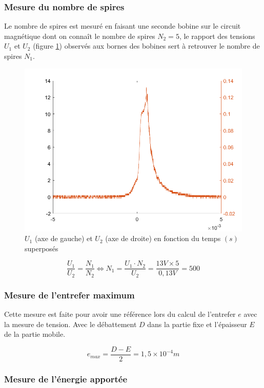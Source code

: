 \documentclass{rapportENS}
\begin{document}
 \subsubsection*{Mesure du nombre de spires}
 
 Le nombre de spires est mesuré en faisant une seconde bobine sur le circuit magnétique dont on connaît le nombre de spires $N_2 = 5$, le rapport des tensions $U_1$ et $U_2$ (figure \ref{nombredespire}) observés aux bornes des bobines sert à retrouver le nombre de spires $N_1$.
 
 \begin{figure}[h!]
  \centering
 \includegraphics[width = .5\linewidth]{nombredespire.png}
 \vspace{0.3cm}
 \caption{$U_1$ (axe de gauche) et $U_2$ (axe de droite) en fonction du temps $(s)$ superposés}
 \label{nombredespire}
 \end{figure}
 
 \begin{equation}
     \frac{U_1}{U_2} = \frac{N_1}{N_2} \Leftrightarrow N_1 = \frac{U_1\cdot N_2}{U_2} = \frac{13V \times 5}{0,13V} = 500
 \end{equation}
 
 \subsubsection*{Mesure de l'entrefer maximum}
 
 Cette mesure est faite pour avoir une référence lors du calcul de l'entrefer $e$ avec la mesure de tension. Avec le débattement $D$ dans la partie fixe et l'épaisseur $E$ de la partie mobile.
 
 \vspace{0.1cm}
 \begin{equation}
     e_{max} = \frac{D-E}{2} = 1,5\times 10^{-4} m
 \end{equation}
 \vspace{0.1cm}
 
 \subsubsection*{Mesure de l'énergie apportée}
 
\end{document}

